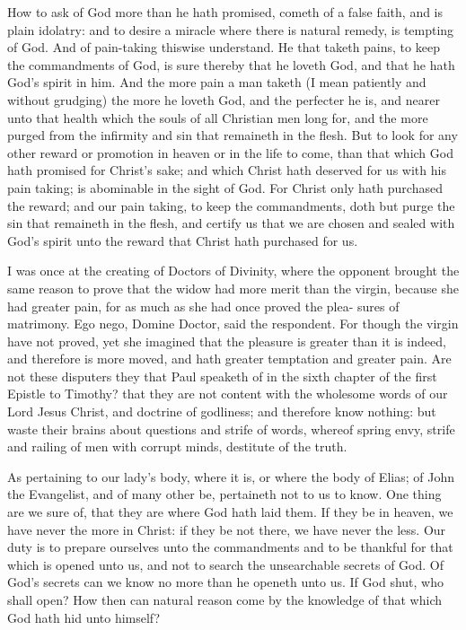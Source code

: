 \documentclass{custom}
\begin{document}
How to ask of God more than he hath promised, 
cometh of a false faith, and is plain idolatry: and to 
desire a miracle where there is natural remedy, is tempting 
of God. And of pain-taking thiswise understand. He 
that taketh pains, to keep the commandments of God, is 
sure thereby that he loveth God, and that he hath God's 
spirit in him. And the more pain a man taketh (I mean
patiently and without grudging) the more he loveth God,
and the perfecter he is, and nearer unto that health which 
the souls of all Christian men long for, and the more purged 
from the infirmity and sin that remaineth in the flesh. But 
to look for any other reward or promotion in heaven or in 
the life to come, than that which God hath promised for 
Christ's sake; and which Christ hath deserved for us with 
his pain taking; is abominable in the sight of God. For 
Christ only hath purchased the reward; and our pain taking, 
to keep the commandments, doth but purge the sin that 
remaineth in the flesh, and certify us that we are chosen 
and sealed with God's spirit unto the reward that Christ 
hath purchased for us. 

I was once at the creating of Doctors of Divinity, where 
the opponent brought the same reason to prove that the 
widow had more merit than the virgin, because she had 
greater pain, for as much as she had once proved the plea- 
sures of matrimony. Ego nego, Domine Doctor, said the 
respondent. For though the virgin have not proved, yet 
she imagined that the pleasure is greater than it is indeed, 
and therefore is more moved, and hath greater temptation 
and greater pain. Are not these disputers they that Paul 
speaketh of in the sixth chapter of the first Epistle to 
Timothy? that they are not content with the wholesome 
words of our Lord Jesus Christ, and doctrine of godliness; 
and therefore know nothing: but waste their brains 
about questions and strife of words, whereof spring envy, 
strife and railing of men with corrupt minds, destitute of 
the truth. 

As pertaining to our lady's body, where it is, or where 
the body of Elias; of John the Evangelist, and of many 
other be, pertaineth not to us to know. One thing are 
we sure of, that they are where God hath laid them. If 
they be in heaven, we have never the more in Christ: if 
they be not there, we have never the less. Our duty is to 
prepare ourselves unto the commandments and to be 
thankful for that which is opened unto us, and not to search 
the unsearchable secrets of God. Of God's secrets can 
we know no more than he openeth unto us. If God shut, 
who shall open? How then can natural reason come by 
the knowledge of that which God hath hid unto himself? 
\end{document}
